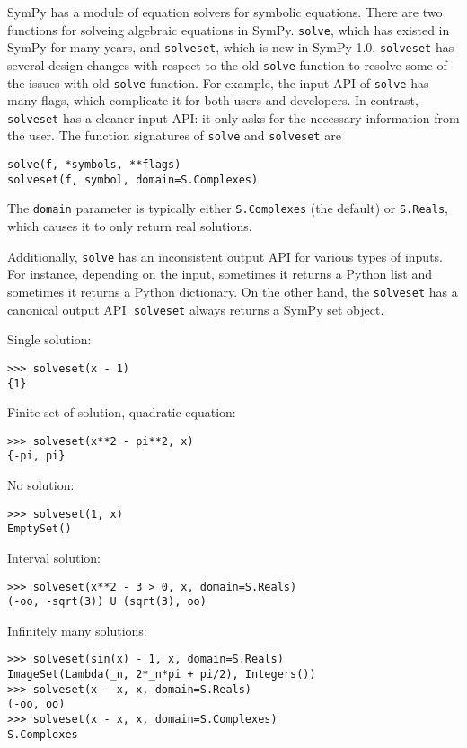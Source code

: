 SymPy has a module of equation solvers for symbolic equations. There are two
functions for solveing algebraic equations in SymPy. \texttt{solve}, which has
existed in SymPy for many years, and \texttt{solveset}, which is new in SymPy 1.0.
\texttt{solveset} has several design changes with respect to the old
\texttt{solve} function to resolve some of the issues with old \texttt{solve}
function. For example, the input API of \texttt{solve} has many flags, which
complicate it for both users and developers. In contrast, \texttt{solveset} has a
cleaner input API\@:  it only asks for the necessary information from the user.
The function signatures of \texttt{solve} and \texttt{solveset} are
\begin{verbatim}
solve(f, *symbols, **flags)
solveset(f, symbol, domain=S.Complexes)
\end{verbatim}
The \texttt{domain} parameter is typically either \texttt{S.Complexes} (the
default) or \texttt{S.Reals}, which causes it to only return real solutions.

Additionally, \texttt{solve} has an inconsistent output API for various types
of inputs. For instance, depending on the input, sometimes it returns a Python
list and sometimes it returns a Python dictionary. On the other hand, the
\texttt{solveset} has a canonical output API. \texttt{solveset} always returns
a SymPy set object.

\noindent Single solution:
\begin{verbatim}
>>> solveset(x - 1)
{1}
\end{verbatim}

\noindent Finite set of solution, quadratic equation:
\begin{verbatim}
>>> solveset(x**2 - pi**2, x)
{-pi, pi}
\end{verbatim}

\noindent No solution:
\begin{verbatim}
>>> solveset(1, x)
EmptySet()
\end{verbatim}

\noindent Interval solution:
\begin{verbatim}
>>> solveset(x**2 - 3 > 0, x, domain=S.Reals)
(-oo, -sqrt(3)) U (sqrt(3), oo)
\end{verbatim}

\noindent Infinitely many solutions:
\begin{verbatim}
>>> solveset(sin(x) - 1, x, domain=S.Reals)
ImageSet(Lambda(_n, 2*_n*pi + pi/2), Integers())
>>> solveset(x - x, x, domain=S.Reals)
(-oo, oo)
>>> solveset(x - x, x, domain=S.Complexes)
S.Complexes
\end{verbatim}

